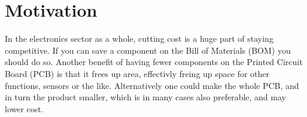 \section{Motivation}
In the electronics sector as a whole, cutting cost is a huge part of staying competitive. If you can save a component on the Bill of Materials (BOM) you should do so. Another benefit of having fewer components on the Printed Circuit Board (PCB) is that it frees up area, effectivly freing up space for other functions, sensors or the like. Alternatively one could make the whole PCB, and in turn the product smaller, which is in many cases also preferable, and may lower cost.


